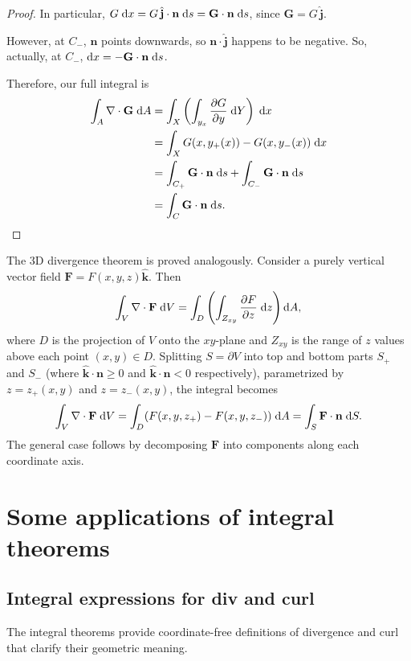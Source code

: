 \documentclass[a4paper]{article}
\begin{document}
\begin{proof}
  In particular, $G\;\mathrm{d} x = G\,\hat{\mathbf{j}}\cdot \mathbf{n}\;\mathrm{d} s = \mathbf{G}\cdot \mathbf{n}\;\mathrm{d} s$, since $\mathbf{G} = G\,\hat{\mathbf{j}}$.

  However, at $C_-$, $\mathbf{n}$ points downwards, so $\mathbf{n}\cdot \hat{\mathbf{j}}$ happens to be negative. So, actually, at $C_-$, $\mathrm{d} x = -\mathbf{G}\cdot \mathbf{n}\;\mathrm{d} s$.

  Therefore, our full integral is
  \begin{align*}
    \int_A \nabla\cdot \mathbf{G}\;\mathrm{d} A &= \int_X \left(\int_{y_x}\frac{\partial G}{\partial y}\;\mathrm{d} Y\right)\;\mathrm{d} x\\
    &= \int_X G(x, y_+(x)) - G(x, y_{-}(x))\;\mathrm{d} x\\
    &= \int_{C_+}\mathbf{G}\cdot \mathbf{n}\;\mathrm{d} s + \int_{C_-}\mathbf{G}\cdot \mathbf{n}\;\mathrm{d} s\\
    &= \int_C \mathbf{G}\cdot \mathbf{n}\;\mathrm{d} s.\qedhere
  \end{align*}
\end{proof}

\begin{rmk}
  The 3D divergence theorem is proved analogously. Consider a purely vertical vector field $\mathbf{F} = F(x, y, z)\hat{\mathbf{k}}$. Then
  \[
    \int_V \nabla\cdot \mathbf{F}\;\mathrm{d} V = \int_D \left(\int_{Z_{xy}} \frac{\partial F}{\partial z}\;\mathrm{d} z\right)\mathrm{d} A,
  \]
  where $D$ is the projection of $V$ onto the $xy$-plane and $Z_{xy}$ is the range of $z$ values above each point $(x, y) \in D$. Splitting $S = \partial V$ into top and bottom parts $S_+$ and $S_-$ (where $\hat{\mathbf{k}}\cdot \mathbf{n} \geq 0$ and $\hat{\mathbf{k}}\cdot \mathbf{n} < 0$ respectively), parametrized by $z = z_+(x, y)$ and $z = z_-(x, y)$, the integral becomes
  \[
    \int_V \nabla\cdot \mathbf{F}\;\mathrm{d} V = \int_D (F(x, y, z_+) - F(x, y, z_-))\;\mathrm{d} A = \int_S \mathbf{F}\cdot \mathbf{n}\;\mathrm{d} S.
  \]
  The general case follows by decomposing $\mathbf{F}$ into components along each coordinate axis.
\end{rmk}
\section{Some applications of integral theorems}
\subsection{Integral expressions for div and curl}
\begin{rmk}
  The integral theorems provide coordinate-free definitions of divergence and curl that clarify their geometric meaning.
\end{rmk}
\end{document}
